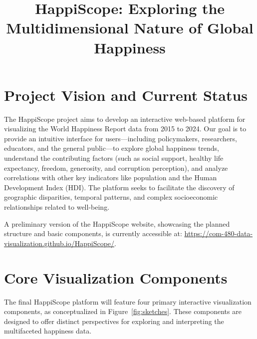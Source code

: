 \documentclass[10pt,conference,compsocconf]{IEEEtran}
\begin{document}
\title{HappiScope: Exploring the Multidimensional Nature of Global Happiness}

\author{%
}

\maketitle

\section{Project Vision and Current Status}
The HappiScope project aims to develop an interactive web-based platform for visualizing the World Happiness Report data from 2015 to 2024. Our goal is to provide an intuitive interface for users—including policymakers, researchers, educators, and the general public—to explore global happiness trends, understand the contributing factors (such as social support, healthy life expectancy, freedom, generosity, and corruption perception), and analyze correlations with other key indicators like population and the Human Development Index (HDI). The platform seeks to facilitate the discovery of geographic disparities, temporal patterns, and complex socioeconomic relationships related to well-being.

A preliminary version of the HappiScope website, showcasing the planned structure and basic components, is currently accessible at: \url{https://com-480-data-visualization.github.io/HappiScope/}.

\section{Core Visualization Components}
The final HappiScope platform will feature four primary interactive visualization components, as conceptualized in Figure~\ref{fig:sketches}. These components are designed to offer distinct perspectives for exploring and interpreting the multifaceted happiness data.
\end{document}
